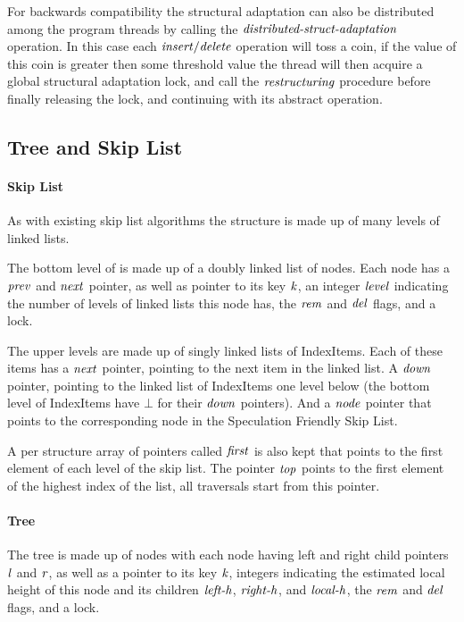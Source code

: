 For backwards compatibility the structural adaptation can also be distributed among the program threads by calling the 
$\ms{distributed-struct-adaptation}$ operation.
In this case each $\ms{insert/delete}$ operation will toss a coin, if the value of this coin is greater then some threshold value
the thread will then acquire a global structural adaptation lock, and call the $\ms{restructuring}$ procedure before finally
releasing the lock, and continuing with its abstract operation.


\subsection{Tree and Skip List}

\paragraph{Skip List}
As with existing skip list algorithms the structure is made up of many levels of linked lists.

The bottom level of is made up of a doubly linked list of nodes.
Each node has a $\ms{prev}$ and $\ms{next}$ pointer, as well as pointer to its key $\ms{k}$,
an integer $\ms{level}$ indicating the number of levels of linked lists this node has,
the $\ms{rem}$ and $\ms{del}$ flags, and a lock.

The upper levels are made up of singly linked lists of IndexItems.
Each of these items has a $\ms{next}$ pointer, pointing to the next item in the linked list.
A $\ms{down}$ pointer, pointing to the linked list of IndexItems one level below (the bottom level
of IndexItems have $\bot$ for their $\ms{down}$ pointers).
And a $\ms{node}$ pointer that points to the corresponding node in the Speculation Friendly Skip List.

A per structure array of pointers called $\ms{first}$ is also kept that points to the first element of each level
of the skip list.
The pointer $\ms{top}$ points to the first element of the highest index of the list, all traversals
start from this pointer.

\paragraph{Tree}
The tree is made up of nodes with each node having left and right child
pointers $\ms{l}$ and $\ms{r}$, as well as a pointer to its key $\ms{k}$,
integers indicating the estimated local height
of this node and its children $\ms{left-h}$, $\ms{right-h}$, and $\ms{local-h}$,
the $\ms{rem}$ and $\ms{del}$ flags, and a lock.


